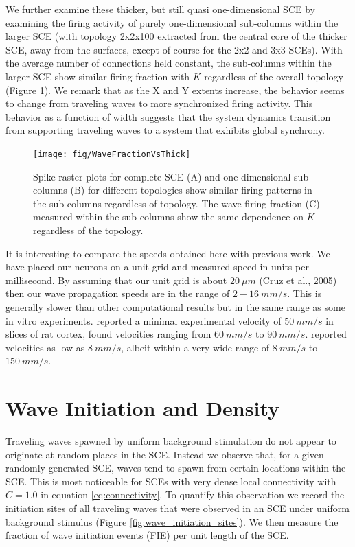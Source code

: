 We further examine these thicker, but still quasi one-dimensional SCE by examining the firing activity of purely one-dimensional sub-columns within the larger SCE (with topology 2x2x100 extracted from the central core of the thicker SCE, away from the surfaces, except of course for the 2x2 and 3x3 SCEs).
With the average number of connections held constant, the sub-columns within the larger SCE show similar firing fraction with $K$ regardless of the overall topology (Figure \ref{fig:LargeSCESubcolumns}).
We remark that as the X and Y extents increase, the behavior seems to change from traveling waves to more synchronized firing activity.
This behavior as a function of width suggests that the system dynamics transition from supporting traveling waves to a system that exhibits global synchrony.
\begin{figure}[!htb]
   \texttt{[image: fig/WaveFractionVsThick]}
   \caption{ Spike raster plots for complete SCE (A) and one-dimensional sub-columns (B) for different topologies show similar firing patterns in the sub-columns regardless  of topology. 
           The wave firing fraction (C) measured within the sub-columns show the same dependence on $K$ regardless of the topology.}
   \label{fig:LargeSCESubcolumns}
\end{figure}
\FloatBarrier

It is interesting to compare the speeds obtained here with previous work.
We have placed our neurons on a unit grid and measured speed in units per millisecond.
By assuming that our unit grid is about $20~\mu m$ (Cruz et al., 2005) then our wave propagation speeds are in the range of $2-16~mm/s$.
This is generally slower than other computational results but in the same range as some in vitro experiments. 
\citet{Golomb1997} reported a minimal experimental velocity of $50~mm/s$ in slices of rat cortex, \citet{Chervin1988} found velocities ranging from $60~mm/s$ to $90~mm/s$.
\citet{Wadman1993} reported velocities as low as $8~mm/s$, albeit within a very wide range of $8~mm/s$ to $150~mm/s$.

\FloatBarrier

\section{Wave Initiation and Density} \label{sub:wave_initiation}
Traveling waves spawned by uniform background stimulation do not appear to originate at random places in the SCE.
Instead we observe that, for a given randomly generated SCE, waves tend to spawn from certain locations within the SCE.
This is most noticeable for SCEs with very dense local connectivity with $C=1.0$ in equation \ref{eq:connectivity}.
To quantify this observation we record the initiation sites of all traveling waves that were observed in an SCE under uniform background stimulus (Figure \ref{fig:wave_initiation_sites}).
We then measure the fraction of wave initiation events (FIE) per unit length of the SCE.

